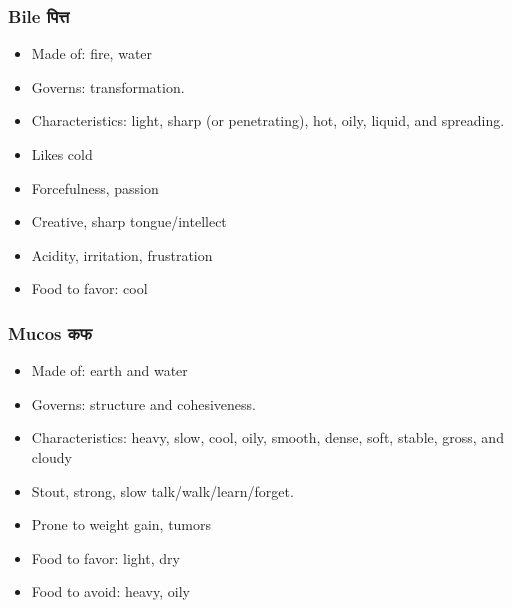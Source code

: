 \begin{frame}[fragile]\frametitle{Bile पित्त}

	\begin{itemize}
	\item Made of: fire, water
	\item Governs: transformation.
	\item Characteristics: light, sharp (or penetrating), hot, oily, liquid, and spreading.	
	\item Likes cold
	\item Forcefulness, passion
	\item Creative, sharp tongue/intellect
	\item Acidity, irritation, frustration
	\item Food to favor: cool
	\end{itemize}

\end{frame}


\begin{frame}[fragile]\frametitle{Mucos कफ}

	\begin{itemize}
	\item Made of: earth and water
	\item Governs: structure and cohesiveness.
	\item Characteristics: heavy, slow, cool, oily, smooth, dense, soft, stable, gross, and cloudy
	\item Stout, strong, slow talk/walk/learn/forget.
	\item Prone to weight gain, tumors
	\item Food to favor: light, dry
	\item Food to avoid: 	heavy, oily
	\end{itemize}

\end{frame}



